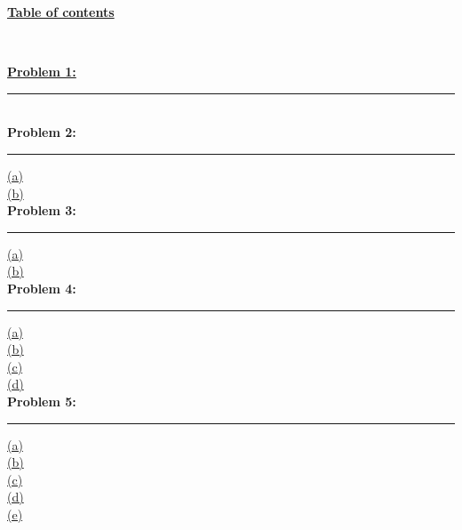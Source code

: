 \documentclass[12pt]{article}
\begin{document}
\begin{center}
	\hypertarget{toc}{\LARGE \noindent \underline{\textbf{Table of contents}}}\\
\end{center}
\noindent\hyperlink{1}{\textbf{Problem 1:}}
\vspace{1mm}
\hrule
\leavevmode \\

\noindent \textbf{Problem 2:}
\vspace{1mm}
\hrule
\vspace{1mm}
\noindent\hyperlink{2.1}{(a)}\\
\hyperlink{2.2}{(b)}\\

\noindent \textbf{Problem 3:}
\vspace{1mm}
\hrule
\vspace{1mm}
\noindent\hyperlink{3.1}{(a)}\\
\noindent\hyperlink{3.2}{(b)}\\

\noindent \textbf{Problem 4:}
\vspace{1mm}
\hrule
\vspace{1mm}
\noindent\hyperlink{4.1}{(a)}\\
\hyperlink{4.2}{(b)}\\
\hyperlink{4.3}{(c)}\\
\hyperlink{4.4}{(d)}\\

\noindent \textbf{Problem 5:}
\vspace{1mm}
\hrule
\vspace{1mm}
\noindent\hyperlink{5.1}{(a)}\\
\hyperlink{5.2}{(b)}\\
\hyperlink{5.3}{(c)}\\
\hyperlink{5.4}{(d)}\\
\hyperlink{5.5}{(e)}\\
\newpage
\end{document}
